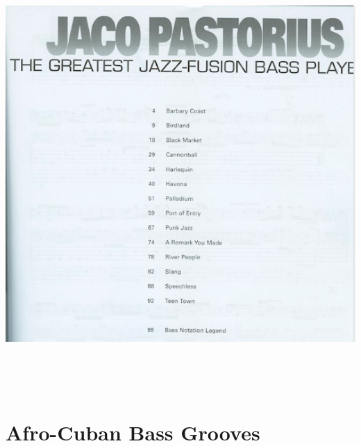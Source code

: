 \documentclass[a4paper]{book}
\begin{document}
\begin{center}
\includegraphics[width=17cm,height=16.323cm]{lebluessupportsmethodes-img164.png}
\end{center}
\clearpage\section{Afro-Cuban Bass Grooves}
\end{document}
